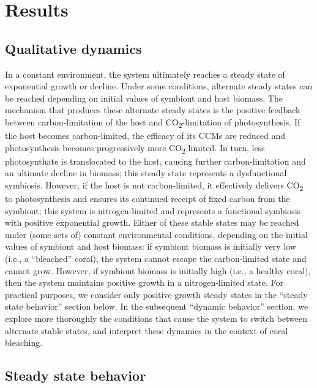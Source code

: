 \documentclass[]{elsarticle} %
\begin{document}
\section{Results}\label{results}

\subsection{Qualitative dynamics}\label{qualitative-dynamics}

In a constant environment, the system ultimately reaches a steady state
of exponential growth or decline. Under some conditions, alternate
steady states can be reached depending on initial values of symbiont and
host biomass. The mechanism that produces these alternate steady states
is the positive feedback between carbon-limitation of the host and
CO\textsubscript{2}-limitation of photosynthesis. If the host becomes
carbon-limited, the efficacy of its CCMs are reduced and photosynthesis
becomes progressively more CO\textsubscript{2}-limited. In turn, less
photosynthate is translocated to the host, causing further
carbon-limitation and an ultimate decline in biomass; this steady state
represents a dysfunctional symbiosis. However, if the host is not
carbon-limited, it effectively delivers CO\textsubscript{2} to
photosynthesis and ensures its continued receipt of fixed carbon from
the symbiont; this system is nitrogen-limited and represents a
functional symbiosis with positive exponential growth. Either of these
stable states may be reached under (some sets of) constant environmental
conditions, depending on the initial values of symbiont and host
biomass: if symbiont biomass is initially very low (i.e., a ``bleached''
coral), the system cannot escape the carbon-limited state and cannot
grow. However, if symbiont biomass is initially high (i.e., a healthy
coral), then the system maintains positive growth in a nitrogen-limited
state. For practical purposes, we consider only positive growth steady
states in the ``steady state behavior'' section below. In the subsequent
``dynamic behavior'' section, we explore more thoroughly the conditions
that cause the system to switch between alternate stable states, and
interpret these dynamics in the context of coral bleaching.

\subsection{Steady state behavior}\label{steady-state-behavior}
\end{document}

